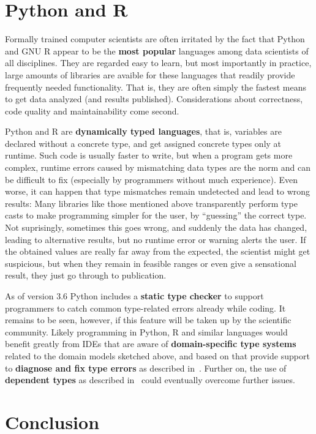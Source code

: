 \documentclass[sigplan,10pt,noacm]{acmart}
\begin{document}
\section{Python and R}

Formally trained computer scientists are often irritated by the fact that Python and GNU R appear to be the \textbf{most popular} languages among data scientists of all disciplines. They are regarded easy to learn, but most importantly in practice, large amounts of libraries are avaible for these languages that readily provide frequently needed functionality. That is, they are often simply the fastest means to get data analyzed (and results published). Considerations about correctness, code quality and maintainability come second.

Python and R are \textbf{dynamically typed languages}, that is, variables are declared without a concrete type, and get assigned concrete types only at runtime. Such code is usually faster to write, but when a program gets more complex, runtime errors caused by mismatching data types are the norm and can be difficult to fix (especially by programmers without much experience).
Even worse, it can happen that type mismatches remain undetected and lead to wrong results: Many libraries like those mentioned above transparently perform type casts to make programming simpler for the user, by \enquote{guessing} the correct type. Not suprisingly, sometimes this goes wrong, and suddenly the data has changed, leading to alternative results, but no runtime error or warning alerts the user. If the obtained values are really far away from the expected, the scientist might get suspicious, but when they remain in feasible ranges or even give a sensational result, they just go through to publication.

As of version 3.6 Python includes a \textbf{static type checker} to support programmers to catch common type-related errors already while coding. It remains to be seen, however, if this feature will be taken up by the scientific community. Likely programming in Python, R and similar languages would benefit greatly from IDEs that are aware of \textbf{domain-specific type systems} related to the domain models sketched above, and based on that provide support to \textbf{diagnose and fix type errors} as described in~\cite{jur}. Further on, the use of \textbf{dependent types} as described in~\cite{wouter} could eventually overcome further issues.


\section{Conclusion}
\end{document}
